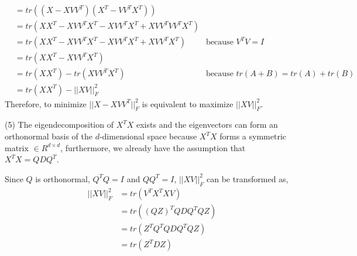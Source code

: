 \documentclass[11pt]{article}
\begin{document}
\begin{solution}
\begin{align*}
	& = tr((X - XVV^T)(X^T - VV^TX^T)) \\
	& = tr(XX^T - XVV^TX^T - XVV^TX^T + XVV^TVV^TX^T) \\
	& = tr(XX^T - XVV^TX^T - XVV^TX^T + XVV^TX^T) & \text{because $V^TV = I$}\\
	& = tr(XX^T - XVV^TX^T)\\
	& = tr(XX^T) - tr(XVV^TX^T) & \text{because ${tr(A+B) = tr(A)+tr(B)}$}  \\
& = tr(XX^T) - || X V ||_F^{2}  
\end{align*}
Therefore, to minimize $|| X - XVV^T ||_F^{2}$ is equivalent to maximize $|| X V ||_F^{2}$.
\item (5) The eigendecomposition of $X^TX$ exists and the eigenvectors can form an orthonormal basis of the $d$-dimensional
space because $X^TX$ forms a symmetric matrix $\in R^{d\times d}$, furthermore, we already have the assumption that $X^TX = QDQ^T$.
\item Since $Q$ is orthonormal, $Q^TQ = I$ and $QQ^T = I$, $|| XV ||_F^{2}$ can be transformed as,
\begin{align*}
	|| XV ||_F^{2}
	& = tr(V^TX^TXV) \\
	& = tr((QZ)^TQDQ^TQZ)\\
& = tr(Z^TQ^TQDQ^TQZ)\\
& = tr(Z^TDZ)
\end{align*}
\end{solution}

\setcounter{page}{12}
\end{document}

